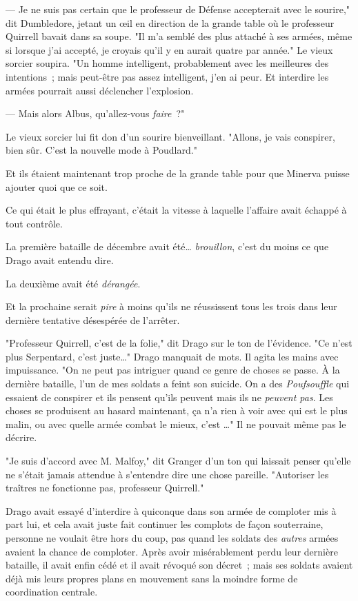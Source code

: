 --- Je ne suis pas certain que le professeur de Défense accepterait avec le sourire," dit Dumbledore, jetant un œil en direction de la grande table où le professeur Quirrell bavait dans sa soupe. "Il m'a semblé des plus attaché à ses armées, même si lorsque j'ai accepté, je croyais qu'il y en aurait quatre par année." Le vieux sorcier soupira. "Un homme intelligent, probablement avec les meilleures des intentions~; mais peut-être pas assez intelligent, j'en ai peur. Et interdire les armées pourrait aussi déclencher l'explosion.

--- Mais alors Albus, qu'allez-vous \emph{faire}~?"

Le vieux sorcier lui fit don d'un sourire bienveillant. "Allons, je vais conspirer, bien sûr. C'est la nouvelle mode à Poudlard."

Et ils étaient maintenant trop proche de la grande table pour que Minerva puisse ajouter quoi que ce soit.

\later

Ce qui était le plus effrayant, c'était la vitesse à laquelle l'affaire avait échappé à tout contrôle.

La première bataille de décembre avait été… \emph{brouillon}, c'est du moins ce que Drago avait entendu dire.

La deuxième avait été \emph{dérangée}.

Et la prochaine serait \emph{pire} à moins qu'ils ne réussissent tous les trois dans leur dernière tentative désespérée de l'arrêter.

"Professeur Quirrell, c'est de la folie," dit Drago sur le ton de l'évidence. "Ce n'est plus Serpentard, c'est juste…" Drago manquait de mots. Il agita les mains avec impuissance. "On ne peut pas intriguer quand ce genre de choses se passe. À la dernière bataille, l'un de mes soldats a feint son suicide. On a des \emph{Poufsouffle} qui essaient de conspirer et ils pensent qu'ils peuvent mais ils ne \emph{peuvent pas}. Les choses se produisent au hasard maintenant, ça n'a rien à voir avec qui est le plus malin, ou avec quelle armée combat le mieux, c'est …" Il ne pouvait même pas le décrire.

"Je suis d'accord avec M. Malfoy," dit Granger d'un ton qui laissait penser qu'elle ne s'était jamais attendue à s'entendre dire une chose pareille. "Autoriser les traîtres ne fonctionne pas, professeur Quirrell."

Drago avait essayé d'interdire à quiconque dans son armée de comploter mis à part lui, et cela avait juste fait continuer les complots de façon souterraine, personne ne voulait être hors du coup, pas quand les soldats des \emph{autres} armées avaient la chance de comploter. Après avoir misérablement perdu leur dernière bataille, il avait enfin cédé et il avait révoqué son décret~; mais ses soldats avaient déjà mis leurs propres plans en mouvement sans la moindre forme de coordination centrale.

